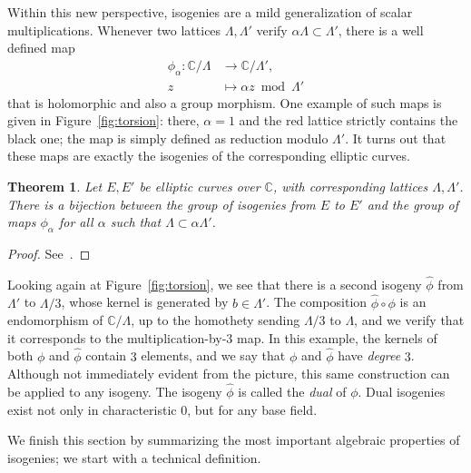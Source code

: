 \documentclass[10pt]{article}
\theoremstyle{plain}
\newtheorem{theorem}{Theorem}
\theoremstyle{definition}
\begin{document}
Within this new perspective, isogenies are a mild generalization of
scalar multiplications. %
Whenever two lattices $Λ,Λ'$ verify $αΛ⊂Λ'$, there is a well defined
map
\begin{align*}
   ϕ_α : ℂ/Λ &\to ℂ/Λ',\\
  z &\mapsto αz \bmod Λ'
\end{align*}
that is holomorphic and also a group morphism. %
One example of such maps is given in Figure~\ref{fig:torsion}: there,
$α=1$ and the red lattice strictly contains the black one; the map is
simply defined as reduction modulo $Λ'$. %
It turns out that these maps are exactly the isogenies of the
corresponding elliptic curves.

\begin{theorem}
  Let $E,E'$ be elliptic curves over $ℂ$, with corresponding lattices
  $Λ,Λ'$. %
  There is a bijection between the group of isogenies from $E$ to $E'$
  and the group of maps $ϕ_α$ for all $α$ such that $Λ⊂αΛ'$.
\end{theorem}
\begin{proof}
  See~\cite[VI, Th.~4.1]{silverman:elliptic}.
\end{proof}

Looking again at Figure~\ref{fig:torsion}, we see that there is a
second isogeny $\hat{ϕ}$ from $Λ'$ to $Λ/3$, whose kernel is generated
by $b∈Λ'$. %
The composition $\hat{ϕ}∘ϕ$ is an endomorphism of $ℂ/Λ$, up to the
homothety sending $Λ/3$ to $Λ$, and we verify that it corresponds to
the multiplication-by-$3$ map. %
In this example, the kernels of both $ϕ$ and $\hat{ϕ}$ contain $3$
elements, and we say that $ϕ$ and $\hat{ϕ}$ have \emph{degree} $3$. %
Although not immediately evident from the picture, this same
construction can be applied to any isogeny. %
The isogeny $\hat{ϕ}$ is called the \emph{dual} of $ϕ$. %
Dual isogenies exist not only in characteristic $0$, but for any base
field. %

We finish this section by summarizing the most important algebraic
properties of isogenies; we start with a technical definition.
\end{document}
